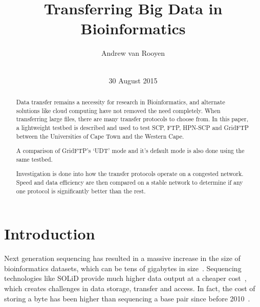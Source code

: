 \documentclass{sig-alternate-05-2015}
\begin{document}
\title{Transferring Big Data in Bioinformatics}

\author{
\alignauthor Andrew van Rooyen\\
\\
}

\date{30 August 2015}


\maketitle
\begin{abstract}
Data transfer remains a necessity for research in Bioinformatics, and alternate solutions like cloud computing have not removed the need completely. When transferring large files, there are many transfer protocols to choose from. In this paper, a lightweight testbed is described and used to test SCP, FTP, HPN-SCP and GridFTP between the Universities of Cape Town and the Western Cape.

A comparison of GridFTP's `UDT' mode and it's default mode is also done using the same testbed.

Investigation is done into how the transfer protocols operate on a congested network. Speed and data efficiency are then compared on a stable network to determine if any one protocol is significantly better than the rest.
\end{abstract}

\section{Introduction}
Next generation sequencing has resulted in a massive increase in the size of bioinformatics datasets, which can be tens of gigabytes in size~\cite{deorowicz2011compression}. Sequencing technologies like SOLiD provide much higher data output at a cheaper cost~\cite{shendure2008next}, which creates challenges in data storage, transfer and access. In fact, the cost of storing a byte has been higher than sequencing a base pair since before 2010~\cite{baker2010next}.
\end{document}
